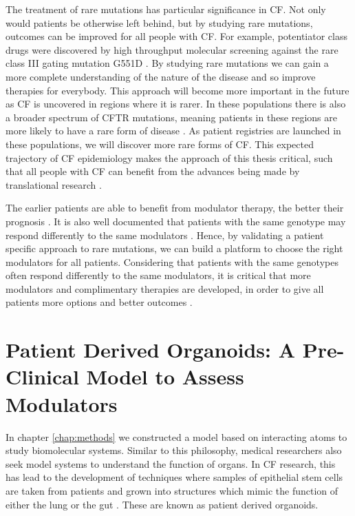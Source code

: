 The treatment of rare mutations has particular significance in CF. Not only would patients be otherwise left behind, but by studying rare mutations, outcomes can be improved for all people with CF. For example, potentiator class drugs were discovered by high throughput molecular screening against the rare class III gating mutation G551D \cite{vangoor2009}. By studying rare mutations we can gain a more complete understanding of the nature of the disease and so improve therapies for everybody. This approach will become more important in the future as CF is uncovered in regions where it is rarer. In these populations there is also a broader spectrum of CFTR mutations, meaning patients in these regions are more likely to have a rare form of disease \cite{singh2015,zheng2017,ni2022}. As patient registries are launched in these populations, we will discover more rare forms of CF. This expected trajectory of CF epidemiology makes the approach of this thesis critical, such that all people with CF can benefit from the advances being made by translational research \cite{zheng2017, garcia2022}. 



The earlier patients are able to benefit from modulator therapy, the better their prognosis \cite{lahiri2022}. It is also well documented that patients with the same genotype may respond differently to the same modulators \cite{hanafin2021}. Hence, by validating a patient specific approach to rare mutations, we can build a platform to choose the right modulators for all patients. Considering that patients with the same genotypes often respond differently to the same modulators, it is critical that more modulators and complimentary therapies are developed, in order to give all patients more options and better outcomes \cite{hanafin2021}.

\section{Patient Derived Organoids: A Pre-Clinical Model to Assess Modulators}
In chapter \ref{chap:methods} we constructed a model based on interacting atoms to study biomolecular systems. Similar to this philosophy, medical researchers also seek model systems to understand the function of organs. In CF research, this has lead to the development of techniques where samples of epithelial stem cells are taken from patients and grown into structures which mimic the function of either the lung or the gut \cite{wong2015,depoel2020}. These are known as patient derived organoids.

